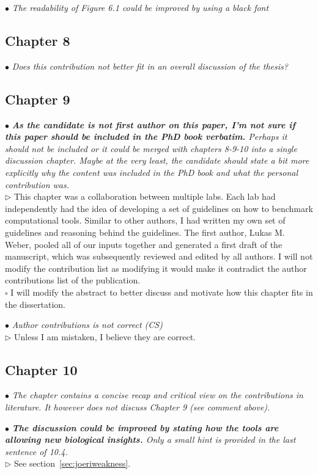 \documentclass[10pt]{article}
\newcommand{\todo}{$\square$}
\newcommand{\exam}[2][\  ]{\hspace{0pt}\marginpar{\color{myred}#1}$\bullet$ \textit{#2}}
\newcommand{\imp}[1]{\textbf{#1}}
\newcommand{\nimp}[1]{{\color{mygray} #1}}
\newcommand{\answ}[1]{{\color{myblue} $\triangleright$ #1}}
\newcommand{\task}[2][\todo]{{\color{myblue} #1 #2}}
\newcommand{\bigexclaim}{\raisebox{-0.1em}{\BigTriangleUp}\hspace{-0.32em}\llap{\small\textbf{!}}\hspace{0.32em}}
\newcommand{\tagimp}{\bigexclaim}
\begin{document}
\exam{The readability of Figure 6.1 could be improved by using a black font}
 



\subsection{Chapter 8}
\exam{Does this contribution not better fit in an overall discussion of the thesis?}


\subsection{Chapter 9}
\exam[\tagimp]{\imp{As the candidate is not first author on this paper, I’m not sure if this paper
		should be included in the PhD book verbatim.} Perhaps it should not be
		included or it could be merged with chapters 8-9-10 into a single discussion
		chapter. Maybe at the very least, the candidate should state a bit more
		explicitly why the content was included in the PhD book and what the personal
		contribution was.} \\
\answ{This chapter was a collaboration between multiple labs. Each lab had independently had the idea of developing a set of guidelines on how to benchmark computational tools. Similar to other authors, I had written my own set of guidelines and reasoning behind the guidelines. The first author, Lukas M. Weber, pooled all of our inputs together and generated a first draft of the manuscript, which was subsequently reviewed and edited by all authors. I will not modify the contribution list as modifying it would make it contradict the author contributions list of the publication.} \\
\task{I will modify the abstract to better discuss and motivate how this chapter fits in the dissertation.}

\exam{Author contributions is not correct (CS)} \\
\answ{Unless I am mistaken, I believe they are correct.}


\subsection{Chapter 10}

\exam{\nimp{The chapter contains a concise recap and critical view on the contributions in
		literature.} It however does not discuss Chapter 9 (see comment above).}


\exam{\imp{The discussion could be improved by stating how the tools are allowing new
		biological insights.} Only a small hint is provided in the last sentence of 10.4.} \\
\answ{See section~\ref{sec:joeriweakness}.}
\end{document}

